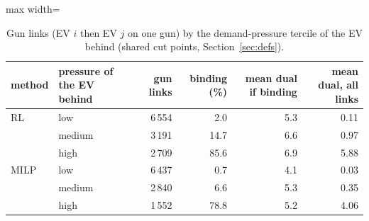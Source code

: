 \begin{table}[H]\centering
\small
\caption{Gun links (EV $i$ then EV $j$ on one gun) by the demand-pressure tercile of the EV behind (shared cut points, Section~\ref{sec:defs}).}\label{tab:gunpressure}
\begin{adjustbox}{max width=\textwidth}\begin{tabular}{llrrrr}\toprule
method & pressure of the EV behind & gun links & binding (\%) & mean dual if binding & mean dual, all links \\ \midrule
RL & low & 6\,554 & 2.0 & 5.3 & 0.11 \\
 & medium & 3\,191 & 14.7 & 6.6 & 0.97 \\
 & high & 2\,709 & 85.6 & 6.9 & 5.88 \\
MILP & low & 6\,437 & 0.7 & 4.1 & 0.03 \\
 & medium & 2\,840 & 6.6 & 5.3 & 0.35 \\
 & high & 1\,552 & 78.8 & 5.2 & 4.06 \\
\bottomrule\end{tabular}\end{adjustbox}\end{table}
